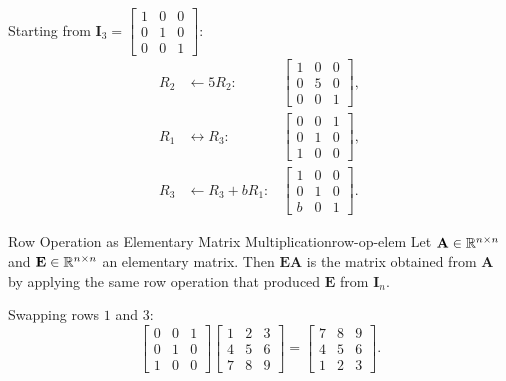\begin{example}
  Starting from $\mathbf{I}_3 =
    \begin{bmatrix}
      1 & 0 & 0 \\ 0 & 1 & 0 \\ 0 & 0 & 1
    \end{bmatrix}
  $:
  \begin{align*}
    R_2 & \leftarrow 5 R_2:       &
    \begin{bmatrix}
      1 & 0 & 0 \\ 0 & 5 & 0 \\ 0 & 0 & 1
    \end{bmatrix}
    ,                               \\
    R_1 & \leftrightarrow R_3:    &
    \begin{bmatrix}
      0 & 0 & 1 \\ 0 & 1 & 0 \\ 1 & 0 & 0
    \end{bmatrix}
    ,                               \\
    R_3 & \leftarrow R_3 + b R_1: &
    \begin{bmatrix}
      1 & 0 & 0 \\ 0 & 1 & 0 \\ b & 0 & 1
    \end{bmatrix}
    .
  \end{align*}
\end{example}

\begin{theorem}{Row Operation as Elementary Matrix Multiplication}{row-op-elem}
  Let $\mathbf{A} \in \mathbb{R}^{n \times n}$ and $\mathbf{E} \in \mathbb{R}^{n \times n}$ an elementary matrix. Then $\mathbf{E}\mathbf{A}$ is the matrix obtained from $\mathbf{A}$ by applying the same row operation that produced $\mathbf{E}$ from $\mathbf{I}_n$.
\end{theorem}

\begin{example}
  Swapping rows $1$ and $3$:
  \[
    \begin{bmatrix}
      0 & 0 & 1 \\ 0 & 1 & 0 \\ 1 & 0 & 0
    \end{bmatrix}
    \begin{bmatrix}
      1 & 2 & 3 \\ 4 & 5 & 6 \\ 7 & 8 & 9
    \end{bmatrix}
    =
    \begin{bmatrix}
      7 & 8 & 9 \\ 4 & 5 & 6 \\ 1 & 2 & 3
    \end{bmatrix}
    .
  \]
\end{example}

